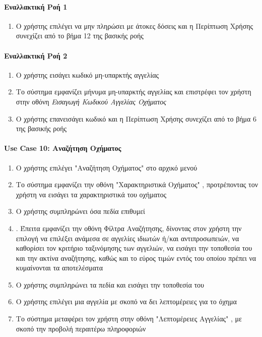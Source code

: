 \documentclass{../ol-softwaremanual}
\begin{document}
	\paragraph{Εναλλακτική Ροή 1}
	\begin{enumerate}
		\item Ο χρήστης επιλέγει να μην πληρώσει με άτοκες δόσεις και η Περίπτωση Χρήσης συνεχίζει από το βήμα 12 της βασικής ροής
	\end{enumerate}
	
	\paragraph{Εναλλακτική Ροή 2}
	\begin{enumerate}
		\item Ο χρήστης εισάγει κωδικό μη-υπαρκτής αγγελίας
		\item Το σύστημα εμφανίζει μήνυμα μη-υπαρκτής αγγελίας και επιστρέφει τον χρήστη στην οθόνη \textit{Εισαγωγή Κωδικού Αγγελίας Οχήματος} 
		\item Ο χρήστης επανεισάγει κωδικό και η Περίπτωση Χρήσης συνεχίζει από το βήμα 6 της βασικής ροής
	\end{enumerate}
	
	\paragraph{\en Use Case 10: \gr Αναζήτηση Οχήματος}  
	\begin{enumerate}
		\item Ο χρήστης επιλέγει \en"\gr Αναζήτηση Οχήματος\en" \gr στο αρχικό μενού
		\item Το σύστημα εμφανίζει την οθόνη \en"\gr Χαρακτηριστικά Οχήματος\en" \gr, προτρέποντας τον χρήστη να εισάγει τα χαρακτηριστικά του οχήματος 
		\item Ο χρήστης συμπληρώνει όσα πεδία επιθυμεί
		\item {}. Έπειτα εμφανίζει την οθόνη Φίλτρα Αναζήτησης, δίνοντας στον χρήστη την επιλογή να επιλέξει ανάμεσα σε αγγελίες ιδιωτών ή/και αντιπροσωπειών, να καθορίσει τον κριτήριο ταξινόμησης των αγγελιών, να εισάγει την τοποθεσία του και την ακτίνα αναζήτησης, καθώς και το εύρος τιμών εντός του οποίου πρέπει να κυμαίνονται τα αποτελέσματα
		\item Ο χρήστης συμπληρώνει τα πεδία και εισάγει την τοποθεσία του 
		\item Ο χρήστης επιλέγει μια αγγελία με σκοπό να δει λεπτομέρειες για το όχημα
		\item Το σύστημα μεταφέρει τον χρήστη στην οθόνη \en"\gr Λεπτομέρειες Αγγελίας\en" \gr, με σκοπό την προβολή περαιτέρω πληροφοριών	
	\end{enumerate}
	
\end{document}
